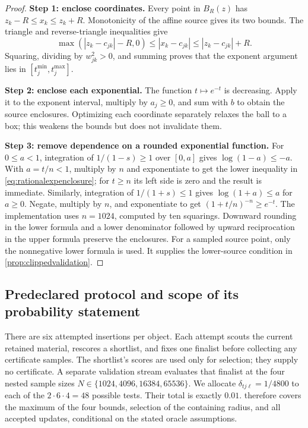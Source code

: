 \begin{proof}
\textbf{Step 1: enclose coordinates.}
Every point in $B_R(z)$ has $z_k-R\le x_k\le z_k+R$.
Monotonicity of the affine source gives its two bounds. The triangle and
reverse-triangle inequalities give
\[
 \max(|z_k-c_{jk}|-R,0)\le|x_k-c_{jk}|
                  \le|z_k-c_{jk}|+R.
\]
Squaring, dividing by $w_{jk}^2>0$, and summing proves that the exponent
argument lies in $[t_j^{\min},t_j^{\max}]$.

\textbf{Step 2: enclose each exponential.}
The function $t\mapsto e^{-t}$ is decreasing. Apply it to the exponent
interval, multiply by $a_j\ge0$, and sum with $b$ to obtain the source
enclosures. Optimizing each coordinate separately relaxes the ball to a box;
this weakens the bounds but does not invalidate them.

\textbf{Step 3: remove dependence on a rounded exponential function.}
For $0\le a<1$, integration of $1/(1-s)\ge1$ over $[0,a]$ gives
$\log(1-a)\le-a$. With $a=t/n<1$, multiply by $n$ and exponentiate to
get the lower inequality in \cref{eq:rationalexpenclosure}; for $t\ge n$
its left side is zero and the result is immediate. Similarly, integration
of $1/(1+s)\le1$ gives $\log(1+a)\le a$ for $a\ge0$. Negate, multiply
by $n$, and exponentiate to get $(1+t/n)^{-n}\ge e^{-t}$.
The implementation uses $n=1024$, computed by ten squarings. Downward
rounding in the lower formula and a lower denominator followed by upward
reciprocation in the upper formula preserve the enclosures. For a sampled
source point, only the nonnegative lower formula is used. It supplies the
lower-source condition in \cref{prop:clippedvalidation}.
\end{proof}

\subsection{Predeclared protocol and scope of its probability statement}

There are six attempted insertions per object. Each attempt scouts the
current retained material, rescores a shortlist, and fixes one finalist
before collecting any certificate samples. The shortlist's scores are
used only for selection; they supply no certificate. A separate validation
stream evaluates that finalist at the four nested sample sizes
$N\in\{1024,4096,16384,65536\}$. We allocate
$\delta_{tj\ell}=1/4800$ to each of the $2\cdot6\cdot4=48$ possible
tests. Their total is exactly $0.01$.  therefore
covers the maximum of the four bounds, selection of the containing radius,
and all accepted updates, conditional on the stated oracle assumptions.

